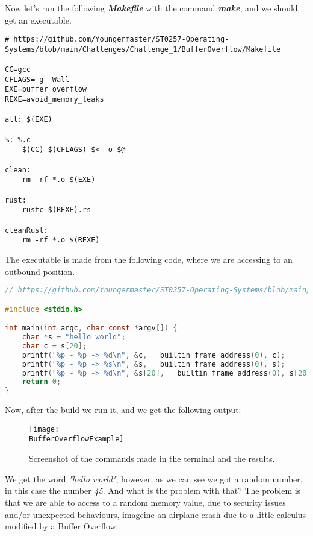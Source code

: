 \clearpage

Now let's run the following \textit{\textbf{Makefile}} with the command \textit{\textbf{make}}, and
we should get an executable.

\begin{lstlisting}[language=Make, caption=This file allow us to build or clean the project.]
# https://github.com/Youngermaster/ST0257-Operating-Systems/blob/main/Challenges/Challenge_1/BufferOverflow/Makefile

CC=gcc
CFLAGS=-g -Wall
EXE=buffer_overflow
REXE=avoid_memory_leaks

all: $(EXE)

%: %.c
	$(CC) $(CFLAGS) $< -o $@

clean:
	rm -rf *.o $(EXE)

rust:
	rustc $(REXE).rs

cleanRust:
	rm -rf *.o $(REXE)
\end{lstlisting}

The executable is made from the following code, where we are accessing to an outbound position.

\begin{lstlisting}[language=C, caption=This file shows an implementation of how to do a buffer
    overflow with C.]
// https://github.com/Youngermaster/ST0257-Operating-Systems/blob/main/Challenges/Challenge_1/BufferOverflow/buffer_overflow.c

#include <stdio.h>

int main(int argc, char const *argv[]) {
    char *s = "hello world";
    char c = s[20];
    printf("%p - %p -> %d\n", &c, __builtin_frame_address(0), c);
    printf("%p - %p -> %s\n", &s, __builtin_frame_address(0), s);
    printf("%p - %p -> %d\n", &s[20], __builtin_frame_address(0), s[20]);
    return 0;
}
\end{lstlisting}

Now, after the build we run it, and we get the following output:

\begin{figure}[h]
    \centering
    \texttt{[image: \\BufferOverflowExample]}
    \caption{Screenshot of the commands made in the terminal and the results.}
\end{figure}

We get the word \textit{"hello world"}, however, as we can see we got a random number, in this case
the number \textit{45}. And what is the problem with that? The problem is that we are able to access
to a random memory value, due to security issues and/or unexpected behaviours, imageine an airplane
crash due to a little calculus modified by a Buffer Overflow.


